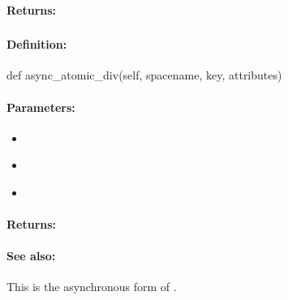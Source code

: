 \paragraph{Returns:}


\pagebreak
\subsubsection{}
\label{api:python:async_atomic_div}


\paragraph{Definition:}
\begin{pythoncode}
def async_atomic_div(self, spacename, key, attributes)
\end{pythoncode}

\paragraph{Parameters:}
\begin{itemize}[noitemsep]
\item {}\\

\item {}\\

\item {}\\

\end{itemize}

\paragraph{Returns:}


\paragraph{See also:}  This is the asynchronous form of .

\pagebreak
\subsubsection{}
\label{api:python:uxact_atomic_div}


